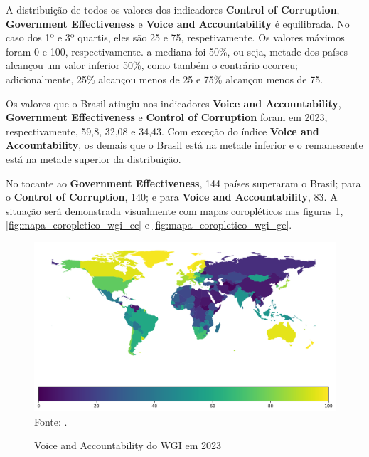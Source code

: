A distribuição de todos os valores dos indicadores \textbf{Control of Corruption}, \textbf{Government Effectiveness} e \textbf{Voice and Accountability} é equilibrada. No caso dos 1º e 3º quartis, eles são 25 e 75, respetivamente. Os valores máximos foram 0 e 100, respectivamente.  a mediana foi 50\%, ou seja, metade dos países alcançou um valor inferior 50\%, como também o contrário ocorreu; adicionalmente, 25\% alcançou menos de 25 e 75\% alcançou menos de 75.

Os valores que o Brasil atingiu nos indicadores \textbf{Voice and Accountability}, \textbf{Government Effectiveness} e \textbf{Control of Corruption} foram em 2023, respectivamente, 59,8, 32,08 e 34,43. Com exceção do índice \textbf{Voice and Accountability}, os demais que o Brasil está na metade inferior e o remanescente está na metade superior da distribuição.

No tocante ao \textbf{Government Effectiveness}, 144 países superaram o Brasil; para o \textbf{Control of Corruption}, 140; e para \textbf{Voice and Accountability}, 83. A situação será demonstrada visualmente com mapas coropléticos nas figuras \ref{fig:mapa_coropletico_wgi_va}, \ref{fig:mapa_coropletico_wgi_cc} e \ref{fig:mapa_coropletico_wgi_ge}.

\begin{figure}[H]
	\centering
	\caption{Voice and Accountability do WGI em 2023}
	\includegraphics[width=1\linewidth]{figuras/mapa_coropletico_wgi_va}
	\label{fig:mapa_coropletico_wgi_va}
	\footnotesize{Fonte: \cite{wgi_dados}.}
\end{figure}

